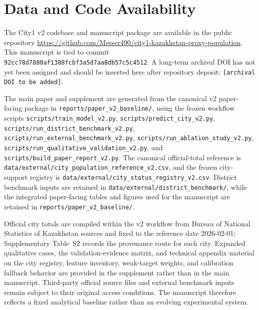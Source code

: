 \section*{Data and Code Availability}

The City1 v2 codebase and manuscript package are available in the public repository \url{https://github.com/Messer490/city1-kazakhstan-proxy-population}. This manuscript is tied to commit \texttt{92cc78d7880af1388fcbf3a5d7aa8db57c5c4512}. A long-term archival DOI has not yet been assigned and should be inserted here after repository deposit: \texttt{[archival DOI to be added]}.

The main paper and supplement are generated from the canonical v2 paper-facing package in \texttt{reports/paper\_v2\_baseline/}, using the frozen workflow scripts \texttt{scripts/train\_model\_v2.py}, \texttt{scripts/predict\_city\_v2.py}, \texttt{scripts/run\_district\_benchmark\_v2.py}, \texttt{scripts/run\_external\_benchmark\_v2.py}, \texttt{scripts/run\_ablation\_study\_v2.py}, \texttt{scripts/run\_qualitative\_validation\_v2.py}, and \texttt{scripts/build\_paper\_report\_v2.py}. The canonical official-total reference is \texttt{data/external/city\_population\_reference\_v2.csv}, and the frozen city-support registry is \texttt{data/external/city\_status\_registry\_v2.csv}. District benchmark inputs are retained in \texttt{data/external/district\_benchmark/}, while the integrated paper-facing tables and figures used for the manuscript are retained in \texttt{reports/paper\_v2\_baseline/}.

Official city totals are compiled within the v2 workflow from Bureau of National Statistics of Kazakhstan sources and fixed to the reference date 2026-02-01; Supplementary Table~S2 records the provenance route for each city. Expanded qualitative cases, the validation-evidence matrix, and technical appendix material on the city registry, feature inventory, weak-target weights, and calibration fallback behavior are provided in the supplement rather than in the main manuscript. Third-party official source files and external benchmark inputs remain subject to their original access conditions. The manuscript therefore reflects a fixed analytical baseline rather than an evolving experimental system.
